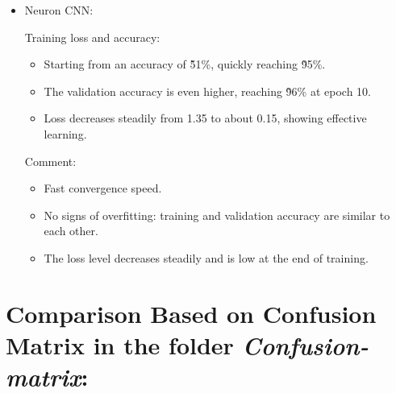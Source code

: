 \documentclass[12pt]{article}
\begin{document}
\begin{itemize}
    \item Neuron CNN:
    
    Training loss and accuracy:

    \begin{itemize}
        \item Starting from an accuracy of \~51\%, quickly reaching \~95\%.
        \item The validation accuracy is even higher, reaching \~96\% at epoch 
        10.
        \item Loss decreases steadily from 1.35 to about 0.15, showing 
        effective learning.
    \end{itemize}

     Comment:

    \begin{itemize}
        \item Fast convergence speed.
        \item No signs of overfitting: training and validation accuracy are 
        similar to each other.
        \item The loss level decreases steadily and is low at the end of 
        training.
    \end{itemize}
    
\end{itemize}

\section{Comparison Based on Confusion Matrix in the folder 
\textit{Confusion-matrix}:}
\end{document}
